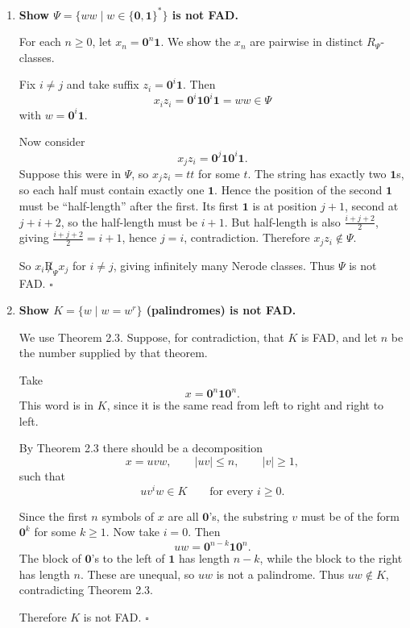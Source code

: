 \begin{enumerate}[{2.}1.]
Hence $\Gamma$ is not FAD. $\square$

\item \textbf{Show $\Psi=\{ww\mid w\in\{\mathbf{0},\mathbf{1}\}^*\}$ is not FAD.}

For each $n\ge 0$, let $x_n=\mathbf{0}^n\mathbf{1}$.
We show the $x_n$ are pairwise in distinct $R_\Psi$-classes.

Fix $i\neq j$ and take suffix $z_i=\mathbf{0}^i\mathbf{1}$.
Then
\[
x_i z_i=\mathbf{0}^i\mathbf{1}\mathbf{0}^i\mathbf{1}=ww\in\Psi
\]
with $w=\mathbf{0}^i\mathbf{1}$.

Now consider
\[
x_j z_i=\mathbf{0}^j\mathbf{1}\mathbf{0}^i\mathbf{1}.
\]
Suppose this were in $\Psi$, so $x_j z_i=tt$ for some $t$.
The string has exactly two $\mathbf{1}$s, so each half must contain exactly one $\mathbf{1}$.
Hence the position of the second $\mathbf{1}$ must be ``half-length'' after the first.
Its first $\mathbf{1}$ is at position $j+1$, second at $j+i+2$, so the half-length must be $i+1$.
But half-length is also $\frac{i+j+2}{2}$, giving $\frac{i+j+2}{2}=i+1$, hence $j=i$, contradiction.
Therefore $x_j z_i\notin\Psi$.

So $x_i\not R_\Psi x_j$ for $i\neq j$, giving infinitely many Nerode classes. Thus $\Psi$ is not FAD. $\square$

\item \textbf{Show $K=\{w\mid w=w^r\}$ (palindromes) is not FAD.}

We use Theorem 2.3. Suppose, for contradiction, that $K$ is FAD, and let $n$
be the number supplied by that theorem.

Take
\[
x=\mathbf{0}^n\mathbf{1}\mathbf{0}^n.
\]
This word is in $K$, since it is the same read from left to right and right to
left.

By Theorem 2.3 there should be a decomposition
\[
x=uvw,\qquad |uv|\le n,\qquad |v|\ge1,
\]
such that
\[
uv^iw\in K\qquad\text{for every }i\ge0.
\]

Since the first $n$ symbols of $x$ are all $\mathbf{0}$'s, the substring $v$
must be of the form $\mathbf{0}^k$ for some $k\ge1$.
Now take $i=0$. Then
\[
uw=\mathbf{0}^{n-k}\mathbf{1}\mathbf{0}^n.
\]
The block of $\mathbf{0}$'s to the left of $\mathbf{1}$ has length $n-k$,
while the block to the right has length $n$. These are unequal, so $uw$ is not
a palindrome. Thus $uw\notin K$, contradicting Theorem 2.3.

Therefore $K$ is not FAD. $\square$


\end{enumerate}
